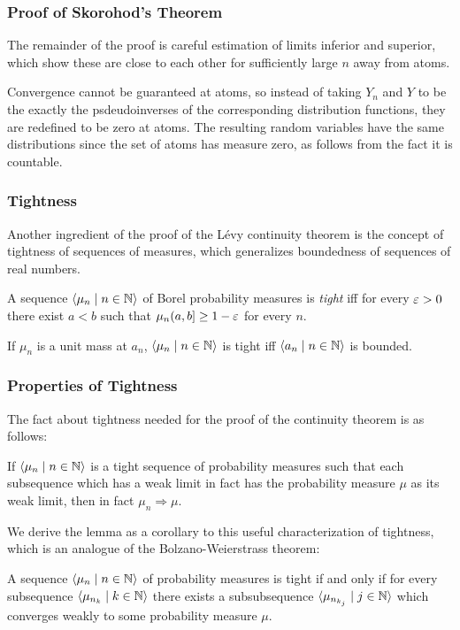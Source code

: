\documentclass{beamer}
\newcommand\bldseq[2]{\langle{#1}\mid{#2}\rangle}
\begin{document}
\begin{frame}
\frametitle{Proof of Skorohod's Theorem}
The remainder of the proof is careful estimation of limits inferior and superior, which show these are close to each other for sufficiently large $n$ away from atoms. \pause

Convergence cannot be guaranteed at atoms, so instead of taking $Y_n$ and $Y$ to be the exactly the psdeudoinverses of the corresponding distribution functions, they are redefined to be zero at atoms. The resulting random variables have the same distributions since the set of atoms has measure zero, as follows from the fact it is countable.
\end{frame}

\begin{frame}
\frametitle{Tightness}
Another ingredient of the proof of the L\'evy continuity theorem is the concept of tightness of sequences of measures, which generalizes boundedness of sequences of real numbers. \pause

\begin{definition}
A sequence $\bldseq{\mu_n}{n \in \N}$ of Borel probability measures is {\em tight} iff for every $\varepsilon > 0$ there exist $a < b$ such that $\mu_n (a,b] \ge 1 - \varepsilon$ for every $n$.
\end{definition}

\pause

If $\mu_n$ is a unit mass at $a_n$, $\bldseq{\mu_n}{n \in \N}$ is tight iff $\bldseq{a_n}{n \in \N}$ is bounded.
\end{frame}

\begin{frame}
\frametitle{Properties of Tightness}
The fact about tightness needed for the proof of the continuity theorem is as follows: \pause

\begin{lemma}
If $\bldseq{\mu_n}{n \in \N}$ is a tight sequence of probability measures such that each subsequence which has a weak limit in fact has the probability measure $\mu$ as its weak limit, then in fact $\mu_n \Rightarrow \mu$.
\end{lemma}

\pause

We derive the lemma as a corollary to this useful characterization of tightness, which is an analogue of the Bolzano-Weierstrass theorem: \pause

\begin{theorem}
A sequence $\bldseq{\mu_n}{n \in \N}$ of probability measures is tight if and only if for every subsequence $\bldseq{\mu_{n_k}}{k \in \N}$ there exists a subsubsequence $\bldseq{\mu_{n_{k_j}}}{j \in \N}$ which converges weakly to some probability measure $\mu$.
\end{theorem}
\end{frame}
\end{document}
